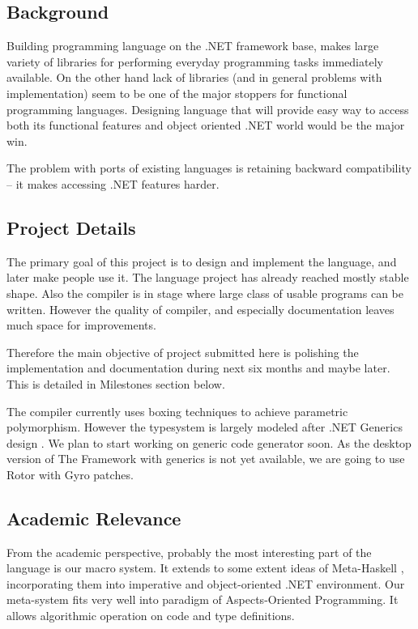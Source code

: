 \documentclass[a4paper,11pt]{article}
\begin{document}
\subsection{Background}
Building programming language on the .NET framework base, makes large
variety of libraries for performing everyday programming tasks immediately
available. On the other hand lack of libraries (and in general problems
with implementation) seem to be one of the major stoppers for functional
programming languages. Designing language that will provide easy way
to access both its functional features and object oriented .NET world
would be the major win.

The problem with ports of existing languages is retaining backward
compatibility -- it makes accessing .NET features harder.


\subsection{Project Details}

The primary goal of this project is to design and implement the language,
and later make people use it. The language project has already reached
mostly stable shape. Also the compiler is in stage where large class of
usable programs can be written. However the quality of compiler, and
especially documentation leaves much space for improvements.

Therefore the main objective of project submitted here is polishing the
implementation and documentation during next six months and maybe later.
This is detailed in Milestones section below.

The compiler currently uses boxing techniques to achieve parametric
polymorphism.  However the typesystem is largely modeled after .NET
Generics design \cite{generics}. We plan to start working on generic code
generator soon. As the desktop version of The Framework with generics
is not yet available, we are going to use Rotor with Gyro patches.


\subsection{Academic Relevance}

From the academic perspective, probably the most interesting part of
the language is our macro system. It extends to some extent
ideas of Meta-Haskell \cite{MetaHaskell}, incorporating them into
imperative and object-oriented .NET environment. Our meta-system fits
very well into paradigm of Aspects-Oriented Programming. It allows
algorithmic operation on code and type definitions.
\end{document}
